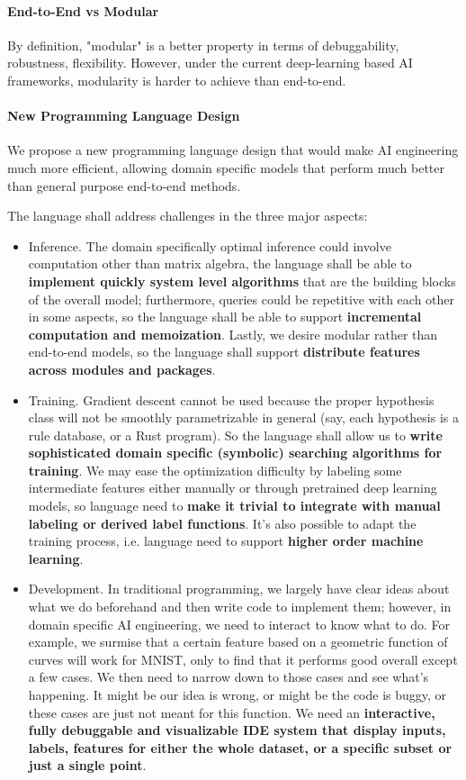 \documentclass[11pt, oneside]{article}   	%
\theoremstyle{definition}
\begin{document}
\paragraph {End-to-End vs Modular} By definition, "modular" is a better property in terms of debuggability, robustness, flexibility. However, under the current deep-learning based AI frameworks, modularity is harder to achieve than end-to-end.

\paragraph {New Programming Language Design}
We propose a new programming language design that would make AI engineering much more efficient, allowing domain specific models that perform much better than general purpose end-to-end methods.

The language shall address challenges in the three major aspects:

\begin{itemize}
	\item Inference. The domain specifically optimal inference could involve computation other than matrix algebra, the language shall be able to \textbf{implement quickly system level algorithms} that are the building blocks of the overall model; furthermore, queries could be repetitive with each other in some aspects, so the language shall be able to support \textbf{incremental computation and memoization}. Lastly, we desire modular rather than end-to-end models, so the language shall support \textbf{distribute features across modules and packages}. 
	\item Training. Gradient descent cannot be used because the proper hypothesis class will not be smoothly parametrizable in general (say, each hypothesis is a rule database, or a Rust program). So the language shall allow us to \textbf{write sophisticated domain specific (symbolic) searching algorithms for training}. We may ease the optimization difficulty by labeling some intermediate features either manually or through pretrained deep learning models, so language need to \textbf{make it trivial to integrate with manual labeling or derived label functions}. It's also possible to adapt the training process, i.e. language need to support \textbf{higher order machine learning}.
	\item Development. In traditional programming, we largely have clear ideas about what we do beforehand and then write code to implement them; however, in domain specific AI engineering, we need to interact to know what to do. For example, we surmise that a certain feature based on a geometric function of curves will work for MNIST, only to find that it performs good overall except a few cases. We then need to narrow down to those cases and see what's happening. It might be our idea is wrong, or might be the code is buggy, or these cases are just not meant for this function. We need an \textbf{interactive, fully debuggable and visualizable IDE system that display inputs, labels, features for either the whole dataset, or a specific subset or just a single point}.
\end{itemize}
\end{document}
